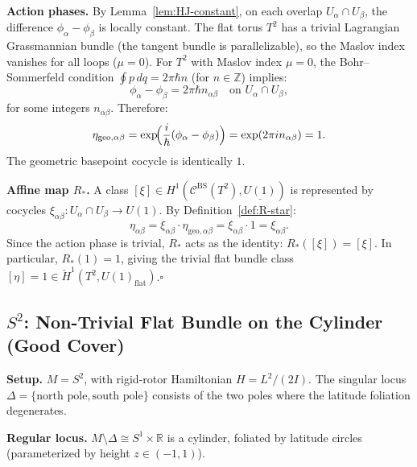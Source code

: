 \documentclass[11pt]{article}
\begin{document}
\textbf{Action phases.}
By Lemma~\ref{lem:HJ-constant}, on each overlap $U_\alpha \cap U_\beta$,
the difference $\phi_\alpha - \phi_\beta$ is locally constant.
The flat torus $T^2$ has a trivial Lagrangian Grassmannian bundle
(the tangent bundle is parallelizable), so the Maslov index vanishes
for all loops ($\mu = 0$). For $T^2$ with Maslov index $\mu = 0$,
the Bohr--Sommerfeld condition
$\oint p\,dq = 2\pi\hbar n$ (for $n \in \mathbb{Z}$) implies:
\[
\phi_\alpha - \phi_\beta = 2\pi\hbar n_{\alpha\beta}
\quad \text{on } U_\alpha \cap U_\beta,
\]
for some integers $n_{\alpha\beta}$. Therefore:
\[
\eta_{\mathrm{geo},\alpha\beta}
= \exp\!\Bigl(\frac{i}{\hbar}(\phi_\alpha - \phi_\beta)\Bigr)
= \exp(2\pi i n_{\alpha\beta}) = 1.
\]
The geometric basepoint cocycle is identically $1$.

\textbf{Affine map $R_*$.}
A class $[\xi] \in H^1(\mathcal{C}^{\mathrm{BS}}(T^2), \underline{U(1)})$
is represented by cocycles $\xi_{\alpha\beta}: U_\alpha \cap U_\beta \to U(1)$.
By Definition~\ref{def:R-star}:
\[
\eta_{\alpha\beta} = \xi_{\alpha\beta} \cdot \eta_{\mathrm{geo},\alpha\beta}
= \xi_{\alpha\beta} \cdot 1 = \xi_{\alpha\beta}.
\]
Since the action phase is trivial, $R_*$ acts as the identity:
$R_*([\xi]) = [\xi]$. In particular, $R_*(1) = 1$, giving the trivial
flat bundle class $[\eta] = 1 \in \check{H}^1(T^2, U(1)_{\mathrm{flat}})$.$\square$


\subsection{$S^2$: Non-Trivial Flat Bundle on the Cylinder (Good Cover)}

\textbf{Setup.}\linebreak
$M = S^2$, with rigid-rotor Hamiltonian $H = L^2/(2I)$.
The singular locus $\Delta = \{\text{north pole}, \text{south pole}\}$
consists of the two poles where the latitude foliation degenerates.

\textbf{Regular locus.}
$M \setminus \Delta \cong S^1 \times \mathbb{R}$ is a cylinder,
foliated by latitude circles (parameterized by height $z \in (-1, 1)$).
\end{document}
